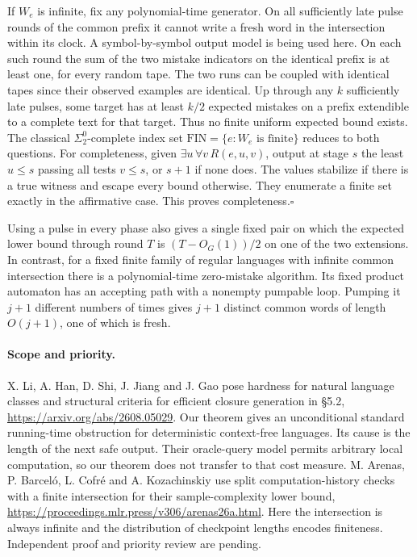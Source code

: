 \documentclass[11pt]{article}
\begin{document}
If $W_e$ is infinite, fix any polynomial-time generator. On all sufficiently late pulse rounds of the common prefix it cannot write a fresh word in the intersection within its clock. A symbol-by-symbol output model is being used here. On each such round the sum of the two mistake indicators on the identical prefix is at least one, for every random tape. The two runs can be coupled with identical tapes since their observed examples are identical. Up through any $k$ sufficiently late pulses, some target has at least $k/2$ expected mistakes on a prefix extendible to a complete text for that target. Thus no finite uniform expected bound exists. The classical $\Sigma^0_2$-complete index set $\mathrm{FIN}=\{e:W_e\text{ is finite}\}$ reduces to both questions. For completeness, given $\exists u\,\forall v\,R(e,u,v)$, output at stage $s$ the least $u\le s$ passing all tests $v\le s$, or $s+1$ if none does. The values stabilize if there is a true witness and escape every bound otherwise. They enumerate a finite set exactly in the affirmative case. This proves completeness.\hfill$\square$

Using a pulse in every phase also gives a single fixed pair on which the expected lower bound through round $T$ is $(T-O_G(1))/2$ on one of the two extensions. In contrast, for a fixed finite family of regular languages with infinite common intersection there is a polynomial-time zero-mistake algorithm. Its fixed product automaton has an accepting path with a nonempty pumpable loop. Pumping it $j+1$ different numbers of times gives $j+1$ distinct common words of length $O(j+1)$, one of which is fresh.

\paragraph{Scope and priority.} X. Li, A. Han, D. Shi, J. Jiang and J. Gao pose hardness for natural language classes and structural criteria for efficient closure generation in §5.2, \url{https://arxiv.org/abs/2608.05029}. Our theorem gives an unconditional standard running-time obstruction for deterministic context-free languages. Its cause is the length of the next safe output. Their oracle-query model permits arbitrary local computation, so our theorem does not transfer to that cost measure. M. Arenas, P. Barcel\'o, L. Cofr\'e and A. Kozachinskiy use split computation-history checks with a finite intersection for their sample-complexity lower bound, \url{https://proceedings.mlr.press/v306/arenas26a.html}. Here the intersection is always infinite and the distribution of checkpoint lengths encodes finiteness. Independent proof and priority review are pending.
\end{document}
